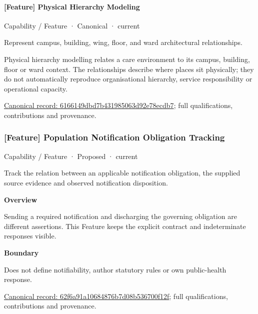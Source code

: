 \paragraph{[Feature] Physical Hierarchy Modeling}

\label{element:6166149dbd7b431985063d92e78ecdb7}
{\small Capability / Feature · Canonical · current}\par

Represent campus, building, wing, floor, and ward architectural relationships.



Physical hierarchy modelling relates a care environment to its campus, building, floor or ward context. The relationships describe where places sit physically; they do not automatically reproduce organisational hierarchy, service responsibility or operational capacity.


{\footnotesize \href{../../../../continuum/strategy/capability/feature/6166149dbd7b431985063d92e78ecdb7.md}{Canonical record: 6166149dbd7b431985063d92e78ecdb7}; full qualifications, contributions and provenance.}\par
\subsubsection{[Feature] Population Notification Obligation Tracking}

\label{element:62f6a91a10684876b7d08b536700f12f}
{\small Capability / Feature · Proposed · current}\par

Track the relation between an applicable notification obligation, the supplied source evidence and observed notification disposition.



\textbf{Overview}



Sending a required notification and discharging the governing obligation are different assertions. This Feature keeps the explicit contract and indeterminate responses visible.



\textbf{Boundary}



Does not define notifiability, author statutory rules or own public-health response.


{\footnotesize \href{../../../../continuum/strategy/capability/feature/62f6a91a10684876b7d08b536700f12f.md}{Canonical record: 62f6a91a10684876b7d08b536700f12f}; full qualifications, contributions and provenance.}\par
